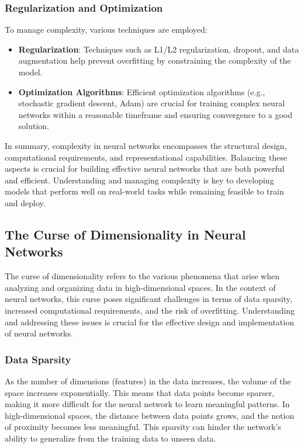 \documentclass[11pt,a4paper]{article}
\begin{document}
\subsubsection{Regularization and Optimization}

To manage complexity, various techniques are employed:

\begin{itemize}
    \item \textbf{Regularization}: Techniques such as L1/L2 regularization, dropout, and data augmentation help prevent overfitting by constraining the complexity of the model.
    
    \item \textbf{Optimization Algorithms}: Efficient optimization algorithms (e.g., stochastic gradient descent, Adam) are crucial for training complex neural networks within a reasonable timeframe and ensuring convergence to a good solution.
\end{itemize}

In summary, complexity in neural networks encompasses the structural design, computational requirements, and representational capabilities. Balancing these aspects is crucial for building effective neural networks that are both powerful and efficient. Understanding and managing complexity is key to developing models that perform well on real-world tasks while remaining feasible to train and deploy.

\subsection{The Curse of Dimensionality in Neural Networks}

The curse of dimensionality refers to the various phenomena that arise when analyzing and organizing data in high-dimensional spaces. In the context of neural networks, this curse poses significant challenges in terms of data sparsity, increased computational requirements, and the risk of overfitting. Understanding and addressing these issues is crucial for the effective design and implementation of neural networks.

\subsubsection{Data Sparsity}

As the number of dimensions (features) in the data increases, the volume of the space increases exponentially. This means that data points become sparser, making it more difficult for the neural network to learn meaningful patterns. In high-dimensional spaces, the distance between data points grows, and the notion of proximity becomes less meaningful. This sparsity can hinder the network's ability to generalize from the training data to unseen data.
\end{document}
